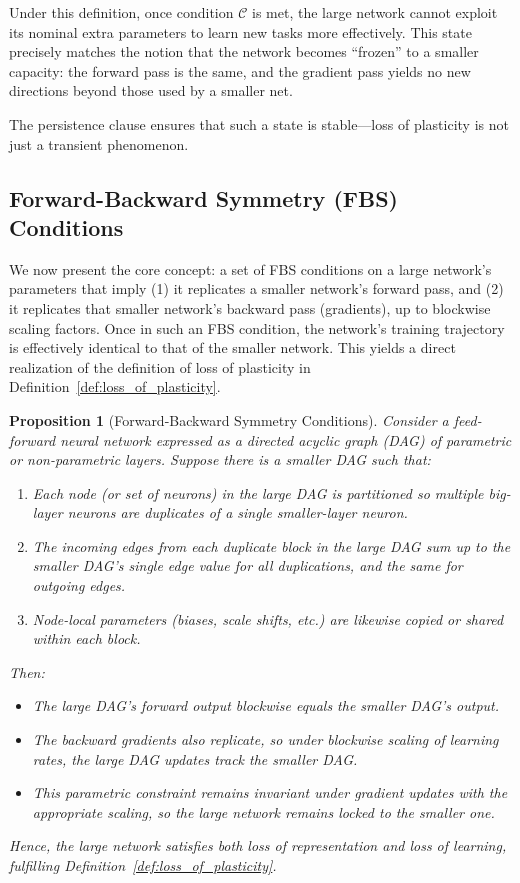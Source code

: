 \documentclass[11pt]{article}
\newtheorem{proposition}{Proposition}[section]
\begin{document}
Under this definition, once condition $\mathcal{C}$ is met, the large network cannot exploit its nominal extra parameters to learn new tasks more effectively. This state precisely matches the notion that the network becomes ``frozen'' to a smaller capacity: the forward pass is the same, and the gradient pass yields no new directions beyond those used by a smaller net.

The persistence clause ensures that such a state is stable---loss of plasticity is not just a transient phenomenon.

\subsection{Forward-Backward Symmetry (FBS) Conditions}
We now present the core concept: a set of FBS conditions on a large network's parameters that imply (1) it replicates a smaller network's forward pass, and (2) it replicates that smaller network's backward pass (gradients), up to blockwise scaling factors. Once in such an FBS condition, the network's training trajectory is effectively identical to that of the smaller network. This yields a direct realization of the definition of loss of plasticity in Definition~\ref{def:loss_of_plasticity}.

\begin{proposition}[Forward-Backward Symmetry Conditions]
\label{prop:FBS_conditions}
Consider a feed-forward neural network expressed as a directed acyclic graph (DAG) of parametric or non-parametric layers. Suppose there is a smaller DAG such that:
\begin{enumerate}
    \item Each node (or set of neurons) in the large DAG is partitioned so multiple big-layer neurons are duplicates of a single smaller-layer neuron.
    \item The incoming edges from each duplicate block in the large DAG sum up to the smaller DAG's single edge value for all duplications, and the same for outgoing edges.
    \item Node-local parameters (biases, scale shifts, etc.) are likewise copied or shared within each block.
\end{enumerate}
Then:
\begin{itemize}
    \item The large DAG's forward output blockwise equals the smaller DAG's output.
    \item The backward gradients also replicate, so under blockwise scaling of learning rates, the large DAG updates track the smaller DAG.
    \item This parametric constraint remains invariant under gradient updates with the appropriate scaling, so the large network remains locked to the smaller one.
\end{itemize}
Hence, the large network satisfies both loss of representation and loss of learning, fulfilling Definition~\ref{def:loss_of_plasticity}.
\end{proposition}
\end{document}
